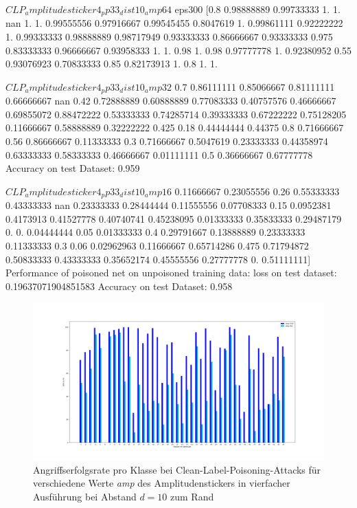 \documentclass[11pt,a4paper]{article}
\numberwithin{equation}{section}
\begin{document}
	$CLP_amplitudesticker4_pp33_dist10_amp64$ eps300
	[0.8        0.98888889 0.99733333 1.         1.                nan
	1.         1.         0.99555556 0.97916667 0.99545455 0.8047619
	1.         0.99861111 0.92222222 1.         0.99333333 0.98888889
	0.98717949 0.93333333 0.86666667 0.93333333 0.975      0.83333333
	0.96666667 0.93958333 1.         1.         0.98       1.
	0.98       0.97777778 1.         0.92380952 0.55       0.93076923
	0.70833333 0.85       0.82173913 1.         0.8        1.
	1.        
	
	$CLP_amplitudesticker4_pp33_dist10_amp32$
	0.7        0.86111111 0.85066667 0.81111111 0.66666667        nan
	0.42       0.72888889 0.60888889 0.77083333 0.40757576 0.46666667
	0.69855072 0.88472222 0.53333333 0.74285714 0.39333333 0.67222222
	0.75128205 0.11666667 0.58888889 0.32222222 0.425      0.18
	0.44444444 0.44375    0.8        0.71666667 0.56       0.86666667
	0.11333333 0.3        0.71666667 0.5047619  0.23333333 0.44358974
	0.63333333 0.58333333 0.46666667 0.01111111 0.5        0.36666667
	0.67777778
	Accuracy on test Dataset: 0.959 
	
	
	$CLP_amplitudesticker4_pp33_dist10_amp16$
	0.11666667 0.23055556 0.26       0.55333333 0.43333333        nan
	0.23333333 0.28444444 0.11555556 0.07708333 0.15       0.0952381
	0.4173913  0.41527778 0.40740741 0.45238095 0.01333333 0.35833333
	0.29487179 0.         0.         0.04444444 0.05       0.01333333
	0.4        0.29791667 0.13888889 0.23333333 0.11333333 0.3
	0.06       0.02962963 0.11666667 0.65714286 0.475      0.71794872
	0.50833333 0.43333333 0.35652174 0.45555556 0.27777778 0.
	0.51111111]
	Performance of poisoned net on unpoisoned training data:
	loss on test dataset: 0.19637071904851583
	Accuracy on test Dataset: 0.958 
	
	\begin{figure}[h]
		\begin{center}
			\includegraphics[width=0.5\textheight]{Vergleich_AER_CLPA.png}
			\caption{Angriffserfolgsrate pro Klasse bei Clean-Label-Poisoning-Attacks für verschiedene Werte \textit{amp} des Amplitudenstickers in vierfacher Ausführung bei Abstand $d=10$ zum Rand}
			\label{fig:AER_proKlasse_CLPA}
		\end{center}
	\end{figure}
	
\end{document}
